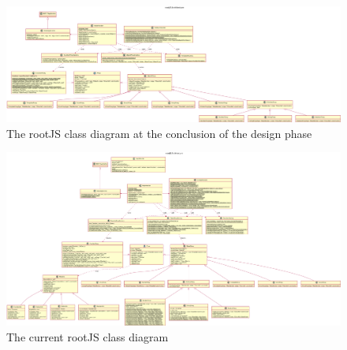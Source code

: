 \begin{figure}[H]
	\centering
	\includegraphics[keepaspectratio=true, width=7.75in, 
	angle=90]{./latex/oldResources/architecture.pdf}
	\caption{The rootJS class diagram at the conclusion of the design phase}
\end{figure}


\begin{figure}[H]
	\centering
	\includegraphics[keepaspectratio=true, width=9in,
	 angle=90]{./latex/resources/architecture.pdf}
	\caption{The current rootJS class diagram }
\end{figure}